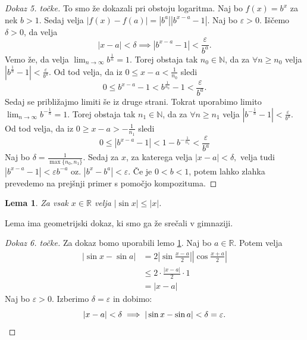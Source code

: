 \documentclass[10pt, a4paper]{article}
\newtheorem{lema}[izr]{Lema}
\newenvironment{noticeC}{%
  \tcolorbox[%
  notitle,
  empty,
  enhanced,  %
  breakable,
  coltext=black, 
  fontupper=\rmfamily,
  noparskip,
  sharp corners,
  boxrule=-1pt,  %
  frame hidden,
  left=7pt,  %
  right=7pt,
  top=5pt,
  bottom=5pt,
  before skip=2.5ex plus 2pt,
  after skip=2.5ex plus 2pt,
  overlay unbroken and last={%
  },
  ]}
{\endtcolorbox}
\newenvironment{dokaz}%
  {\begin{noticeC}\begin{proof}}%
  {\end{proof}\end{noticeC}}
\newcommand{\N}{\mathbb {N}}
\newcommand{\R}{\mathbb {R}}
\newcommand{\limzap}[1]{\lim_{n \to \infty} {#1}}
\begin{document}
\begin{dokaz}[Dokaz 5. točke]
            To smo že dokazali pri obstoju logaritma. Naj bo 
            $f(x) = b^x$ za nek $b >1$.
            Sedaj velja $|f(x) - f(a)| = |b^a||b^{x-a}-1|$.
            Naj bo $\varepsilon>0$. Iščemo $\delta>0$, da velja
            $$|x-a|<\delta \implies |b^{x-a}-1|<\frac{\varepsilon}{b^a}.$$ 
            Vemo že, da velja
                $\limzap{b^{\frac{1}{n}}} = 1.$
                Torej obstaja tak $n_0 \in \N$, da za $\forall n \geq n_0$ velja
                $|b^{\frac{1}{n}} - 1| < \frac{\varepsilon}{b^a}.$
                Od tod velja, da iz $0 \leq x-a < \frac{1}{n_0}$ sledi $$0 \leq b^{x-a} - 1 < b^{\frac{1}{n_0}} -1 < \frac{\varepsilon}{b^a}.$$
            Sedaj se približajmo limiti še iz druge strani. Tokrat uporabimo limito $\limzap{b^{-\frac{1}{n}}} = 1.$
                Torej obstaja tak $n_1 \in \N$, da za $\forall n \geq n_1$ velja
                $|b^{-\frac{1}{n}} - 1| < \frac{\varepsilon}{b^a}.$
                Od tod velja, da iz $0 \geq x-a > -\frac{1}{n_1}$ sledi $$0 \leq |b^{x-a} - 1| < 1 - b^{-\frac{1}{n_1}}  < \frac{\varepsilon}{b^a}$$
            Naj bo $\delta = \frac{1}{\max\{n_0, n_1\}}.$ Sedaj za $x$, za katerega velja
            $|x-a|<\delta,$ velja tudi
            $|b^{x-a} - 1|<\varepsilon b^{-a}$ oz. $|b^x - b^a| < \varepsilon$.
            Če je $0 < b < 1$, potem lahko zlahka prevedemo na prejšnji primer s pomočjo kompozituma.
        \end{dokaz}

            \begin{lema} 
                \label{lem:4}
                Za vsak $x \in \R$ velja
                $|\sin x| \leq |x|$. 
            \end{lema}
Lema ima geometrijski dokaz, ki smo ga že srečali v gimnaziji.

        \begin{dokaz}[Dokaz 6. točke]
            Za dokaz bomo uporabili lemo \ref{lem:4}.
            Naj bo $a \in \R$. Potem velja
            \begin{align*}
                |\sin x - \sin a| &= 2|\sin {\frac{x-a}{2}}||\cos {\frac{x+a}{2}}|\\
                &\leq 2 \cdot \frac{|x-a|}{2} \cdot 1\\
                &= |x-a|
            \end{align*}
            Naj bo $\varepsilon>0.$ Izberimo $\delta = \varepsilon$ in dobimo:
            \begin{equation*}
                |x-a| < \delta \implies |\sin x - \sin a| < \delta = \varepsilon. \qedhere
            \end{equation*}
        \end{dokaz}
\end{document}
